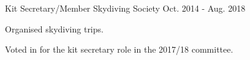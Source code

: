 

\begin{cventries}

  \cventry
    {Kit Secretary/Member} %
    {Skydiving Society} %
    {} %
    {Oct. 2014 - Aug. 2018} %
    {
      \begin{cvitems} %
        \item {Organised skydiving trips.}
        \item {Voted in for the kit secretary role in the 2017/18 committee.}
      \end{cvitems}
    }

\end{cventries}
